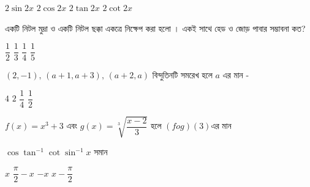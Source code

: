 \documentclass[addpoints]{exam}
\begin{document}
\begin{questions}
\begin{oneparchoices}
\choice $ 2\sin 2x $
\choice $ 2\cos 2x $
\choice $ 2\tan 2x $
\choice $ 2\cot 2x $

\end{oneparchoices}

\question একটি নিটল মুদ্রা ও একটি নিটল ছক্কা একত্রে  নিক্ষেপ করা হলো । একই সাথে হেড ও জোড় পাবার সম্ভাবনা কত?

\begin{oneparchoices}
\choice $ \dfrac{1}{2} $
\choice $ \dfrac{1}{3} $
\choice $ \dfrac{1}{4} $
\choice $ \dfrac{1}{5} $
\end{oneparchoices}

\question $ (2,-1),\,(a+1,a+3),\,(a+2, a) $  বিন্দুতিনটি সমরেখ হলে $ a $ এর মান -

\begin{oneparchoices}
\choice $ 4 $
\choice $ 2 $
\choice $ \dfrac{1}{4} $
\choice $ \dfrac{1}{2}$

\end{oneparchoices}

\question $ f(x) = x^{3}+3 $ এবং $ g(x) = \sqrt[3]{\dfrac{x-2}{3}} $ হলে $ (fog)(3) $এর মান


\begin{oneparchoices}

\end{oneparchoices}

\question  $ \cos\tan^{-1}\cot\sin^{-1}x $ সমান

\begin{oneparchoices}
\choice $ x $
\choice $ \dfrac{\pi}{2}-x $
\choice $ -x $
\choice $ x-\dfrac{\pi}{2} $
\end{oneparchoices}

\end{questions}
\end{document}
